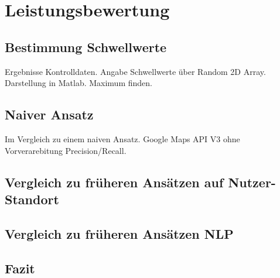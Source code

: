 \chapter{Leistungsbewertung} 





	\section{Bestimmung Schwellwerte} 
		
		Ergebnisse Kontrolldaten.
		Angabe Schwellwerte über Random 2D Array. 
		Darstellung in Matlab.
		Maximum finden. 

	\section{Naiver Ansatz}
		
		Im Vergleich zu einem naiven Ansatz.
		Google Maps API V3 ohne Vorverarebitung 
		Precision/Recall. 


	\section{Vergleich zu früheren Ansätzen auf Nutzer-Standort}
		

	\section{Vergleich zu früheren Ansätzen NLP}
		

	\section{Fazit}   


